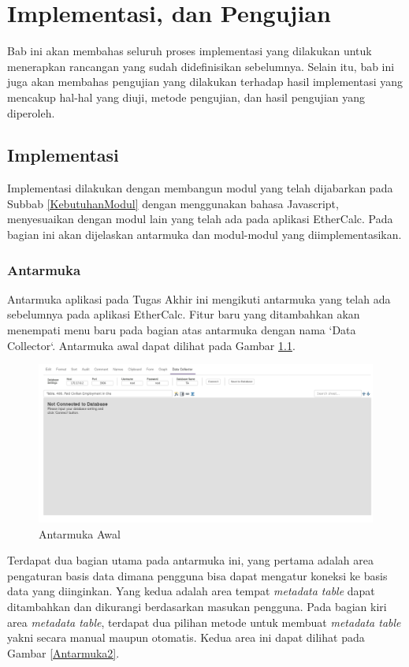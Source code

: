 \chapter{Implementasi, dan Pengujian}

Bab ini akan membahas seluruh proses implementasi yang dilakukan untuk menerapkan rancangan yang sudah didefinisikan sebelumnya. Selain itu, bab ini juga akan membahas pengujian yang dilakukan terhadap hasil implementasi yang mencakup hal-hal yang diuji, metode pengujian, dan hasil pengujian yang diperoleh. 


\section{Implementasi}
Implementasi dilakukan dengan membangun modul yang telah dijabarkan pada Subbab \ref{KebutuhanModul} dengan menggunakan bahasa Javascript, menyesuaikan dengan modul lain yang telah ada pada aplikasi EtherCalc. Pada bagian ini akan dijelaskan antarmuka dan modul-modul yang diimplementasikan.
\subsection{Antarmuka}
Antarmuka aplikasi pada Tugas Akhir ini mengikuti antarmuka yang telah ada sebelumnya pada aplikasi EtherCalc. Fitur baru yang ditambahkan akan menempati menu baru pada bagian atas antarmuka dengan nama `Data Collector`. Antarmuka awal dapat dilihat pada Gambar \ref{Antarmuka1}.

\begin{figure}[htb]
	\centering
	\includegraphics[width=1.0\textwidth]{resources/chapter-4-interface-1.png}
	\caption{Antarmuka Awal}
	\label{Antarmuka1}
\end{figure}

Terdapat dua bagian utama pada antarmuka ini, yang pertama adalah area pengaturan basis data dimana pengguna bisa dapat mengatur koneksi ke basis data yang diinginkan. Yang kedua adalah area tempat \textit{metadata table} dapat ditambahkan dan dikurangi berdasarkan masukan pengguna. Pada bagian kiri area \textit{metadata table}, terdapat dua pilihan metode untuk membuat \textit{metadata table} yakni secara manual maupun otomatis. Kedua area ini dapat dilihat pada Gambar \ref{Antarmuka2}.

